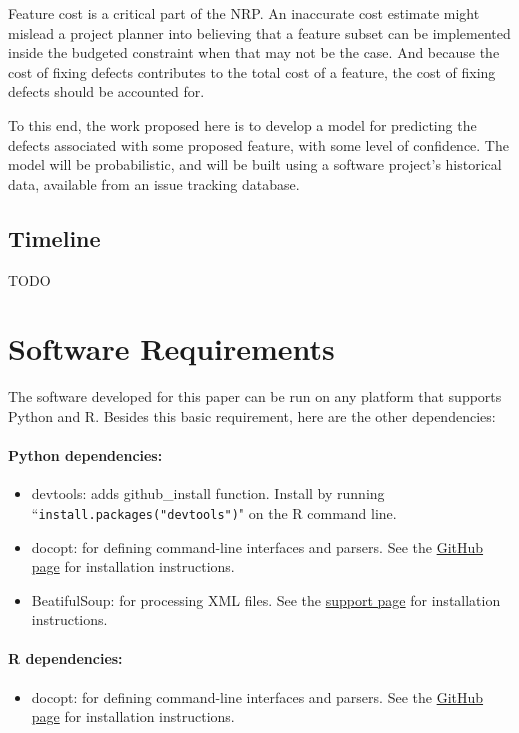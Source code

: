 \documentclass[a4paper]{scrartcl}
\begin{document}
Feature cost is a critical part of the NRP. An inaccurate cost estimate might mislead a project planner into believing that a feature subset can be implemented inside the budgeted constraint when that may not be the case. And because the cost of fixing defects contributes to the total cost of a feature, the cost of fixing defects should be accounted for.

To this end, the work proposed here is to develop a model for predicting the defects associated with some proposed feature, with some level of confidence. The model will be probabilistic, and will be built using a software project's historical data, available from an issue tracking database.

\subsection{Timeline}
TODO

\appendix
\section{Software Requirements}
\label{sw_reqs}
The software developed for this paper can be run on any platform that supports Python and R. Besides this basic requirement, here are the other dependencies:
\paragraph{Python dependencies:}
\begin{itemize}
\item
devtools: adds github\_install function. Install by running ``\verb|install.packages("devtools")|" on the R command line.
\item
docopt: for defining command-line interfaces and parsers. See the \href{https://github.com/docopt/docopt}{GitHub page} for installation instructions.
\item
BeatifulSoup: for processing XML files. See the \href{http://www.crummy.com/software/BeautifulSoup}{support page} for installation instructions.
\end{itemize}

\paragraph{R dependencies:}
\begin{itemize}
\item{docopt: for defining command-line interfaces and parsers. See the \href{https://github.com/edwindj/docopt.R}{GitHub page} for installation instructions.}
\end{itemize}




\end{document}
